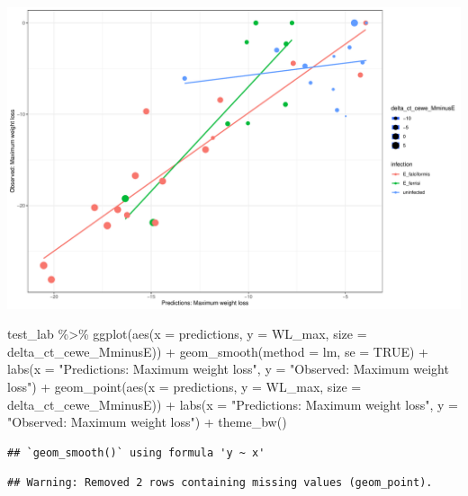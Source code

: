 \documentclass[
]{article}
\newenvironment{Shaded}{\begin{snugshade}}{\end{snugshade}}
\newcommand{\AttributeTok}[1]{\textcolor[rgb]{0.77,0.63,0.00}{#1}}
\newcommand{\ConstantTok}[1]{\textcolor[rgb]{0.00,0.00,0.00}{#1}}
\newcommand{\FunctionTok}[1]{\textcolor[rgb]{0.00,0.00,0.00}{#1}}
\newcommand{\NormalTok}[1]{#1}
\newcommand{\SpecialCharTok}[1]{\textcolor[rgb]{0.00,0.00,0.00}{#1}}
\newcommand{\StringTok}[1]{\textcolor[rgb]{0.31,0.60,0.02}{#1}}
\begin{document}
\includegraphics{8.Random_Forest_lab_gene_files/figure-latex/unnamed-chunk-9-2.pdf}

\begin{Shaded}
\begin{Highlighting}[]
\NormalTok{test\_lab   }\SpecialCharTok{\%\textgreater{}\%}
  \FunctionTok{ggplot}\NormalTok{(}\FunctionTok{aes}\NormalTok{(}\AttributeTok{x =}\NormalTok{ predictions, }\AttributeTok{y =}\NormalTok{ WL\_max, }
                 \AttributeTok{size =}\NormalTok{ delta\_ct\_cewe\_MminusE)) }\SpecialCharTok{+}
  \FunctionTok{geom\_smooth}\NormalTok{(}\AttributeTok{method =}\NormalTok{ lm, }\AttributeTok{se =} \ConstantTok{TRUE}\NormalTok{) }\SpecialCharTok{+}
  \FunctionTok{labs}\NormalTok{(}\AttributeTok{x =} \StringTok{"Predictions: Maximum weight loss"}\NormalTok{, }
       \AttributeTok{y =} \StringTok{"Observed: Maximum weight loss"}\NormalTok{) }\SpecialCharTok{+}
  \FunctionTok{geom\_point}\NormalTok{(}\FunctionTok{aes}\NormalTok{(}\AttributeTok{x =}\NormalTok{ predictions, }\AttributeTok{y =}\NormalTok{ WL\_max,  }\AttributeTok{size =}\NormalTok{ delta\_ct\_cewe\_MminusE)) }\SpecialCharTok{+}
  \FunctionTok{labs}\NormalTok{(}\AttributeTok{x =} \StringTok{"Predictions: Maximum weight loss"}\NormalTok{, }
       \AttributeTok{y =} \StringTok{"Observed: Maximum weight loss"}\NormalTok{) }\SpecialCharTok{+}
    \FunctionTok{theme\_bw}\NormalTok{()}
\end{Highlighting}
\end{Shaded}

\begin{verbatim}
## `geom_smooth()` using formula 'y ~ x'
\end{verbatim}

\begin{verbatim}
## Warning: Removed 2 rows containing missing values (geom_point).
\end{verbatim}
\end{document}
